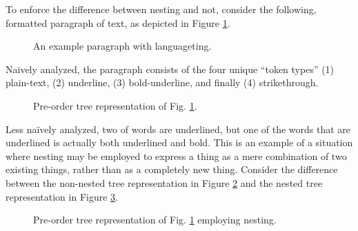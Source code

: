 \documentclass{scrreprt}
\begin{document}
To enforce the difference between nesting and not, consider the following, formatted paragraph of text, as depicted in Figure \ref{fig:mixed-content-paragraph}.


\begin{figure}[h]
\centering
{}
\caption{An example paragraph with languageting.}
\label{fig:mixed-content-paragraph}
\end{figure}


Naively analyzed, the paragraph consists of the four unique ``token types'' (1) plain-text, (2) underline, (3) bold-underline, and finally (4) strikethrough.





\begin{figure}[h]
  \centering

  \caption{Pre-order tree representation of Fig. \ref{fig:mixed-content-paragraph}.}
  \label{fig:mixed-content-flat-tree}
\end{figure}



Less naïvely analyzed, two of words are underlined, but one of the words that are underlined is actually both underlined and bold. This is an example of a situation where nesting may be employed to express a thing as a mere combination of two existing things, rather than as a completely new thing. Consider the difference between the non-nested tree representation in Figure \ref{fig:mixed-content-flat-tree} and the nested tree representation in Figure \ref{fig:mixed-content-tree}.


\begin{figure}[h]
  \centering

  \caption{Pre-order tree representation of Fig. \ref{fig:mixed-content-paragraph} employing nesting.}
  \label{fig:mixed-content-tree}
\end{figure}
\end{document}
